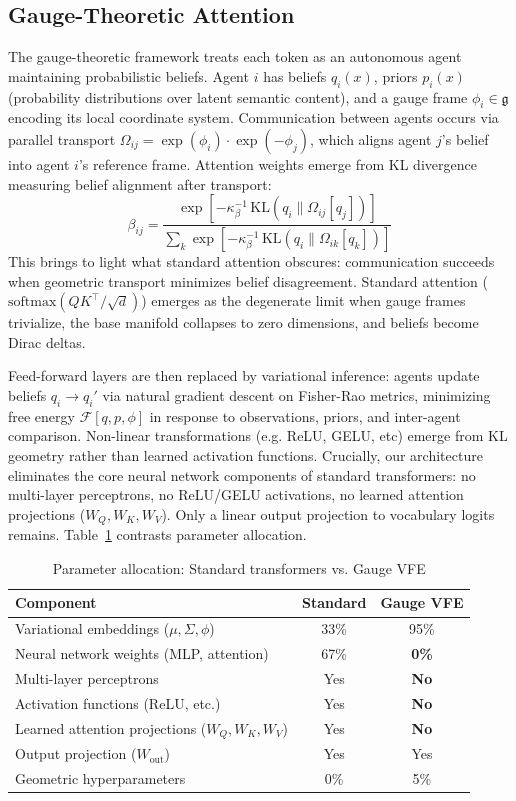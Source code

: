 \documentclass[twoside,11pt]{article}
\begin{document}
\subsection{Gauge-Theoretic Attention}

The gauge-theoretic framework treats each token as an autonomous agent maintaining probabilistic beliefs. Agent $i$ has beliefs $q_i(x)$, priors $p_i(x)$ (probability distributions over latent semantic content), and a gauge frame $\phi_i \in \mathfrak{g}$ encoding its local coordinate system. Communication between agents occurs via parallel transport $\Omega_{ij} = \exp(\phi_i) \cdot \exp(-\phi_j)$, which aligns agent $j$'s belief into agent $i$'s reference frame. Attention weights emerge from KL divergence measuring belief alignment after transport:
%
\begin{equation}
\beta_{ij} = \frac{\exp\!\left[-\kappa_\beta^{-1} \, \mathrm{KL}(q_i \| \Omega_{ij}[q_j])\right]}{\sum_k \exp\!\left[-\kappa_\beta^{-1} \, \mathrm{KL}(q_i \| \Omega_{ik}[q_k])\right]}
\end{equation}
%
This brings to light what standard attention obscures: communication succeeds when geometric transport minimizes belief disagreement. Standard attention ($\mathrm{softmax}(QK^\top/\sqrt{d})$) emerges as the degenerate limit when gauge frames trivialize, the base manifold collapses to zero dimensions, and beliefs become Dirac deltas.

Feed-forward layers are then replaced by variational inference: agents update beliefs $q_i \to q_i'$ via natural gradient descent on Fisher-Rao metrics, minimizing free energy $\mathcal{F}[q,p, \phi]$ in response to observations, priors, and inter-agent comparison. Non-linear transformations (e.g. ReLU, GELU, etc) emerge from KL geometry rather than learned activation functions. Crucially, our architecture eliminates the core neural network components of standard transformers: no multi-layer perceptrons, no ReLU/GELU activations, no learned attention projections ($W_Q, W_K, W_V$). Only a linear output projection to vocabulary logits remains. Table~\ref{tab:params} contrasts parameter allocation.

\begin{table}[t]
\centering
\caption{Parameter allocation: Standard transformers vs. Gauge VFE}
\label{tab:params}
\begin{tabular}{lcc}
\toprule
\textbf{Component} & \textbf{Standard} & \textbf{Gauge VFE} \\
\midrule
Variational embeddings ($\mu, \Sigma, \phi$) & 33\% & 95\% \\
Neural network weights (MLP, attention) & 67\% & \textbf{0\%} \\
Multi-layer perceptrons & Yes & \textbf{No} \\
Activation functions (ReLU, etc.) & Yes & \textbf{No} \\
Learned attention projections ($W_Q, W_K, W_V$) & Yes & \textbf{No} \\
Output projection ($W_{\text{out}}$) & Yes & Yes \\
Geometric hyperparameters & 0\% & 5\% \\
\bottomrule
\end{tabular}
\end{table}
\end{document}

